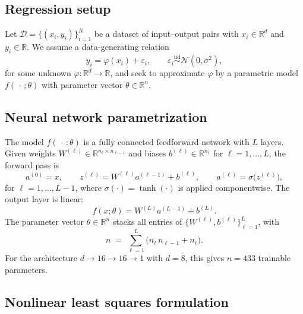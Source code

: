 \documentclass[11pt,letterpaper]{article}
\newcommand{\R}{\mathbb{R}}
\theoremstyle{definition}
\begin{document}
\subsection{Regression setup}
 
Let $\mathcal{D} = \{(x_i, y_i)\}_{i=1}^{N}$ be a dataset of
input--output pairs with $x_i \in \R^{d}$ and $y_i \in \R$. We assume a
data-generating relation
\begin{equation}
y_i = \varphi(x_i) + \varepsilon_i, \qquad
\varepsilon_i \overset{\text{iid}}{\sim} \mathcal{N}(0, \sigma^2),
\label{eq:data-gen}
\end{equation}
for some unknown $\varphi : \R^d \to \R$, and seek to approximate $\varphi$
by a parametric model $f(\,\cdot\,;\theta)$ with parameter vector
$\theta \in \R^{n}$.
 
\subsection{Neural network parametrization}
 
The model $f(\,\cdot\,;\theta)$ is a fully connected feedforward network
with $L$ layers. Given weights
$W^{(\ell)} \in \R^{n_\ell \times n_{\ell-1}}$ and biases
$b^{(\ell)} \in \R^{n_\ell}$ for $\ell = 1,\ldots,L$, the forward pass is
\begin{equation}
a^{(0)} = x,\qquad
z^{(\ell)} = W^{(\ell)} a^{(\ell-1)} + b^{(\ell)},\qquad
a^{(\ell)} = \sigma\bigl(z^{(\ell)}\bigr),
\label{eq:forward}
\end{equation}
for $\ell = 1,\ldots,L-1$, where $\sigma(\cdot) = \tanh(\cdot)$ is applied
componentwise. The output layer is linear:
\begin{equation}
f(x;\theta) = W^{(L)} a^{(L-1)} + b^{(L)}.
\label{eq:output}
\end{equation}
The parameter vector $\theta \in \R^n$ stacks all entries of
$\{W^{(\ell)}, b^{(\ell)}\}_{\ell=1}^{L}$, with
\begin{equation}
n \;=\; \sum_{\ell=1}^{L}\bigl(n_\ell\, n_{\ell-1} + n_\ell\bigr).
\end{equation}
For the architecture $d \to 16 \to 16 \to 1$ with $d = 8$, this gives
$n = 433$ trainable parameters.
 
\subsection{Nonlinear least squares formulation}
 
\end{document}
